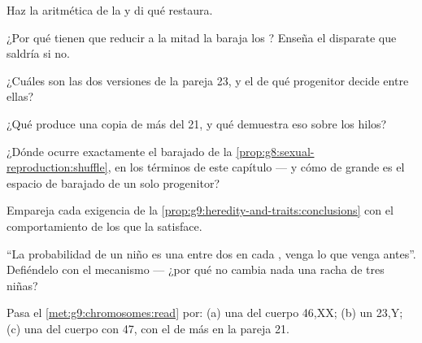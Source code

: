 \begin{exercise}[$\star$]\label{exo:g9:chromosomes:3}
Haz la aritmética de la  y di qué restaura.
\end{exercise}

\begin{exercise}[$\star$]\label{exo:g9:chromosomes:4}
¿Por qué tienen que reducir a la mitad la baraja los ? Enseña el
disparate que saldría si no.
\end{exercise}

\begin{exercise}[$\star$]\label{exo:g9:chromosomes:5}
¿Cuáles son las dos versiones de la pareja 23, y el  de qué
progenitor decide entre ellas?
\end{exercise}

\begin{exercise}[$\star$]\label{exo:g9:chromosomes:6}
¿Qué produce una copia de más del  21, y qué demuestra eso
sobre los hilos?
\end{exercise}

\begin{exercise}[$\star\star$]\label{exo:g9:chromosomes:7}
¿Dónde ocurre exactamente el barajado de la
\cref{prop:g8:sexual-reproduction:shuffle}, en los términos de este
capítulo --- y cómo de grande es el espacio de barajado de un solo
progenitor?
\end{exercise}

\begin{exercise}[$\star\star$]\label{exo:g9:chromosomes:8}
Empareja cada exigencia de la
\cref{prop:g9:heredity-and-traits:conclusions} con el comportamiento de
los  que la satisface.
\end{exercise}

\begin{exercise}[$\star\star$]\label{exo:g9:chromosomes:9}
``La probabilidad de un niño es una entre dos en cada , venga
lo que venga antes''. Defiéndelo con el mecanismo --- ¿por qué no
cambia nada una racha de tres niñas?
\end{exercise}

\begin{exercise}[$\star\star$]\label{exo:g9:chromosomes:10}
Pasa el \cref{met:g9:chromosomes:read} por: (a) una  del cuerpo
46,XX; (b) un  23,Y; (c) una  del cuerpo con 47, con el de
más en la pareja 21.
\end{exercise}

